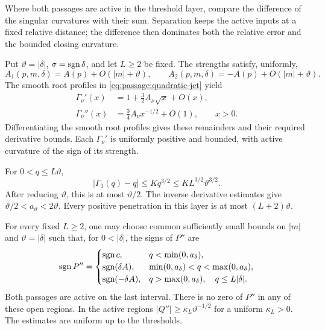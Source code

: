 Where both passages are active in the threshold layer, compare the difference of the singular
curvatures with their sum. Separation keeps the active inputs at a fixed
relative distance; the difference then dominates both the relative error
and the bounded closing curvature.

Put \(\vartheta=|\delta|\), \(\sigma=\operatorname{sgn}\delta\), and let \(L\ge2\) be fixed.
The strengths satisfy, uniformly,
\[
 A_1(p,m,\delta)=A(p)+O(|m|+\vartheta),\qquad
 A_2(p,m,\delta)=-A(p)+O(|m|+\vartheta).
\]
The smooth root profiles in \eqref{eq:passage:quadratic-jet} yield
\begin{align}
 \Gamma_\nu'(x)
  &=1+\tfrac32 A_\nu\sqrt{x}+O(x),\label{eq:inner-derivative}\\
 \Gamma_\nu''(x)
  &=\tfrac34 A_\nu x^{-1/2}+O(1),\qquad x>0.\label{eq:inner-curvature}
\end{align}
Differentiating the smooth root profiles gives these remainders and their
required derivative bounds. Each $\Gamma_\nu'$ is uniformly positive and
bounded, with active curvature of the sign of its strength.

For \(0<q\le L\vartheta\),
\begin{equation}\label{eq:first-correction}
 |\Gamma_1(q)-q|\le Kq^{3/2}\le K L^{3/2}\vartheta^{3/2}.
\end{equation}
After reducing \(\vartheta\), this is at most \(\vartheta/2\).
The inverse derivative estimates give \(\vartheta/2<a_\vartheta<2\vartheta\).
Every positive penetration in this layer is at most \((L+2)\vartheta\).

\begin{lemma}\label{lem:event-layer}
For every fixed \(L\ge2\), one may choose common sufficiently small
bounds on \(|m|\) and \(\vartheta=|\delta|\) such that, for \(0<|\delta|\),
the signs of \(P''\) are
\begin{equation}\label{eq:event-signs}
 \operatorname{sgn} P''=
 \begin{cases}
 \operatorname{sgn} c,&q<\min(0,a_\delta),\\
 \operatorname{sgn}(\delta A),&\min(0,a_\delta)<q<\max(0,a_\delta),\\
 \operatorname{sgn}(-\delta A),&
       q>\max(0,a_\delta),\quad q\le L|\delta|.
 \end{cases}
\end{equation}
Both passages are active on the last interval. There is no zero of \(P''\) in any
of these open regions. In the active regions
\(|Q''|\ge\kappa_L \vartheta^{-1/2}\) for a uniform \(\kappa_L>0\).
The estimates are uniform up to the thresholds.
\end{lemma}

